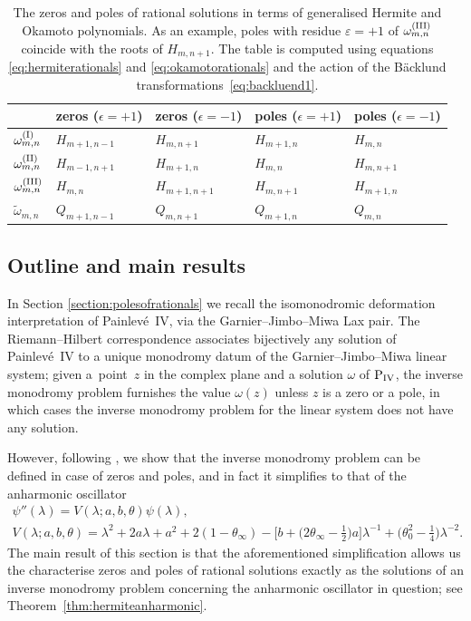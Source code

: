 \documentclass[pdftex]{sigma}
\numberwithin{equation}{section}
\newcommand{\e}{\varepsilon}
\begin{document}
{\renewcommand{\arraystretch}{1.4}
	\begin{table}[t]
		\centering
		\begin{tabular}{l || l | l | l | l }
			& zeros ($\epsilon=+1$) & zeros ($\epsilon=-1$) & poles ($\epsilon=+1$) & poles ($\epsilon=-1$)\\
			\hline\hline
			$\omega_{m,n}^{({\rm I})}$ & $H_{m+1,n-1}$ & $H_{m,n+1}$ & $H_{m+1,n}$ & $H_{m,n}$\\
			$\omega_{m,n}^{({\rm II})}$ & $H_{m-1,n+1}$ & $H_{m+1,n}$ & $H_{m,n}$ & $H_{m,n+1}$\\
			$\omega_{m,n}^{({\rm III})}$ & $H_{m,n}$ & $H_{m+1,n+1}$ & $H_{m,n+1}$ & $H_{m+1,n}$\\
			\hline
			$\widetilde{\omega}_{m,n}$ & $Q_{m+1,n-1}$ & $Q_{m,n+1}$ & $Q_{m+1,n}$ & $Q_{m,n}$\\
		\end{tabular}
\caption{The zeros and poles of rational solutions in terms of generalised Hermite and Okamoto polynomials. As an example, poles with residue $\e=+1$ of $\omega_{m,n}^{({\rm III})}$ coincide with the roots of $H_{m,n+1}$. The table is computed using equations \eqref{eq:hermiterationals} and \eqref{eq:okamotorationals} and	the action of the B\"acklund transformations~\eqref{eq:backluend1}.}\label{table:zerosandpoles}
	\end{table}
}

\subsection{Outline and main results}
In Section \ref{section:polesofrationals} we recall the isomonodromic deformation interpretation of Painlev\'e~IV, via the Garnier--Jimbo--Miwa Lax pair.
The Riemann--Hilbert correspondence associates bijectively any solution of Painlev\'e~IV to a unique monodromy datum of the Garnier--Jimbo--Miwa linear system; given a~point~$z$ in the complex plane and a solution $\omega$ of ${\rm P}_{\rm IV}$, the inverse monodromy problem furnishes the value $\omega(z)$ unless $z$ is a zero or a pole, in which cases the inverse monodromy problem for the linear system does not have any solution.

However, following \cite{piwkb}, we show that the inverse monodromy problem can be def\/ined in case of zeros and poles, and in fact it simplif\/ies to that of the anharmonic oscillator
\begin{gather*}
\psi''(\lambda) = V(\lambda;a,b,\theta)\psi(\lambda),\\ \nonumber
V(\lambda;a,b,\theta)=\lambda^2+2a\lambda+a^2+2(1-\theta_\infty)
-\big[b+\big(2\theta_\infty-\tfrac{1}{2}\big)a\big]\lambda^{-1}+\big(\theta_0^2-\tfrac{1}{4}\big)\lambda^{-2} .
\end{gather*}
The main result of this section is that the aforementioned simplif\/ication allows us the characterise zeros and poles of rational solutions exactly as
the solutions of an inverse monodromy problem concerning the anharmonic oscillator in question; see Theorem~\ref{thm:hermiteanharmonic}.
\end{document}

